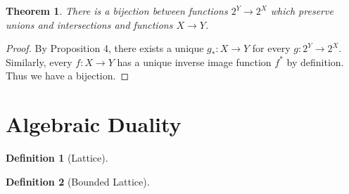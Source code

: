 \documentclass{article}
\newtheorem{theorem}{Theorem}
\newtheorem{definition}{Definition}
\begin{document}
\begin{theorem}
There is a bijection between functions $2^Y \to 2^X$ which preserve unions and intersections and functions $X \to Y$.
\end{theorem}

\begin{proof}
By Proposition 4, there exists a unique $g_* : X \to Y$ for every $g : 2^Y \to 2^X$. Similarly, every $f : X \to Y$ has a unique inverse image function $f^*$ by definition. Thus we have a bijection.
\end{proof}


\section{Algebraic Duality}

\begin{definition}[Lattice]

\end{definition}

\begin{definition}[Bounded Lattice]

\end{definition}
\end{document}
